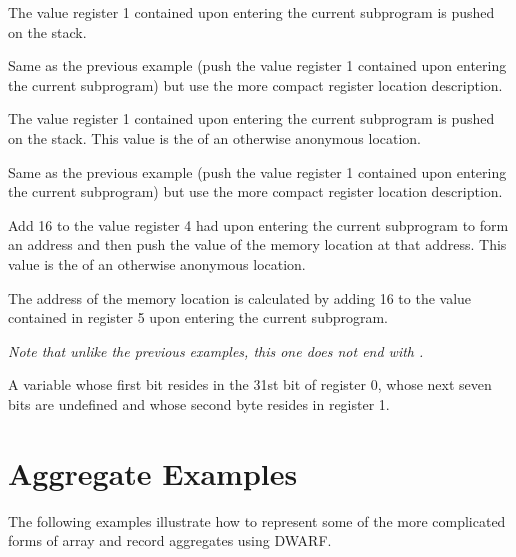 \begin{description}
The value register 1 contained upon entering the current subprogram is 
pushed on the stack.

\descriptionitemnl{\DWOPentryvalue{} 1 \DWOPregone{} }
Same as the previous example
(push the value register 1 contained upon entering the current subprogram)
but use the more compact register location description.

\descriptionitemnl{\DWOPentryvalue{} 2 \DWOPbregone{} 0 \DWOPstackvalue }
The value register 1 contained upon entering the current subprogram is 
pushed on the stack. This value is the
 of an otherwise anonymous location.

\descriptionitemnl{\DWOPentryvalue{} 1 \DWOPregone{} \DWOPstackvalue }
Same as the previous example (push the value register 1 contained
upon entering the current subprogram) but use the more compact
register location description.

\descriptionitemnl{\DWOPentryvalue{} 3 \DWOPbregfour{} 16 \DWOPderef{} \DWOPstackvalue }
Add 16 to the value register 4 had upon entering the current subprogram
to form an address and then push the value of the memory location at that address.
This value is the  of an otherwise anonymous location.

The address of the memory location is calculated by adding 16 to the value
contained in register 5 upon entering the current subprogram.

\textit{Note that unlike the previous \DWOPentryvalue{} examples, this one does not end
with \DWOPstackvalue.{}}

\vspace{-1\parsep}
A variable whose first bit resides in the 31st bit of register 0, whose next 
seven bits are undefined and whose second byte resides in register 1.
\end{description}

\section{Aggregate Examples}
\label{app:aggregateexamples}

The following examples illustrate how to represent some of
the more complicated forms of array and record aggregates
using DWARF.

